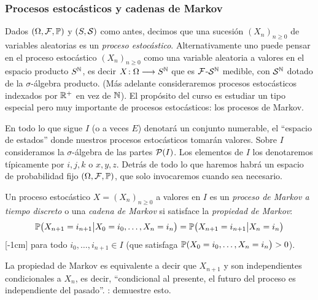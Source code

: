 \subsubsection{Procesos estocásticos y cadenas de Markov}

Dados $(\Omega,\mathcal{F},\mathbb{P})$ y $(S,\mathcal{S})$ como antes, decimos que una sucesión $(X_n)_{n\geq0}$ de variables aleatorias es un \emph{proceso estocástico}.
Alternativamente uno puede pensar en el proceso estocástico $(X_n)_{n\geq0}$ como una variable aleatoria a valores en el espacio producto $S^{\mathbb{N}}$, es decir $X\!:\Omega\longrightarrow S^{\mathbb{N}}$ que es $\mathcal{F}$-$\mathcal{S}^{\mathbb{N}}$ medible, con $\mathcal{S}^{\mathbb{N}}$ dotado de la $\sigma$-álgebra producto.
\lsep
(Más adelante consideraremos procesos estocásticos indexados por $\mathbb{R}^+$ en vez de $\mathbb{N}$).
\lsep
El propósito del curso es estudiar un tipo especial pero muy importante de procesos estocásticos: los procesos de Markov.

\vs

En todo lo que sigue $I$ (o a veces $E$) denotará un conjunto numerable, el ``espacio de estados'' donde nuestros procesos estocásticos tomarán valores.
Sobre $I$ consideramos la $\sigma$-álgebra de las partes $\mathcal{P}(I)$.
Los elementos de $I$ los denotaremos típicamente por $i,j,k$ o $x,y,z$.
Detrás de todo lo que haremos habrá un espacio de probabilidad fijo $(\Omega,\mathcal{F},\mathbb{P})$, que solo invocaremos cuando sea necesario.

\begin{defn}
Un proceso estocástico $X=(X_n)_{n\geq0}$ a valores en $I$ es un \emph{proceso de Markov a tiempo discreto} o una \emph{cadena de Markov} si satisface la \emph{propiedad de Markov}:
\begin{equation}\label{eq:propMarkov}
\mathbb{P}\big(X_{n+1}=i_{n+1}\big|X_0=i_0,\dotsc,X_{n}=i_{n}\big)=\mathbb{P}\big(X_{n+1}=i_{n+1}\big|X_{n}=i_{n}\big)
\end{equation}[-1cm]
para todo $i_0,\dotsc,i_{n+1}\in I$ (que satisfaga $\mathbb{P}(X_0=i_0,\dotsc,X_{n}=i_{n}\big)>0$).
\end{defn}

\begin{rem}
La propiedad de Markov es equivalente a decir que $X_{n+1}$ y  son independientes condicionales a $X_n$, es decir, ``condicional al presente, el futuro del proceso es independiente del pasado''.
\uexer: demuestre esto.
\end{rem}


